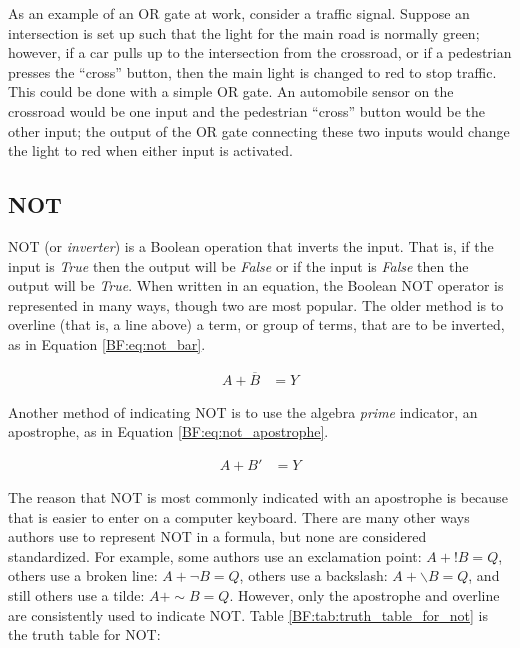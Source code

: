 As an example of an \textsf{OR} gate at work, consider a traffic signal. Suppose an intersection is set up such that the light for the main road is normally green; however, if a car pulls up to the intersection from the crossroad, or if a pedestrian presses the ``cross'' button, then the main light is changed to red to stop traffic. This could be done with a simple \textsf{OR} gate. An automobile sensor on the crossroad would be one input and the pedestrian ``cross'' button would be the other input; the output of the \textsf{OR}  gate connecting these two inputs would change the light to red when either input is activated.

\subsection{NOT}
\label{BF:subsec:not}

\textsf{NOT} (or \emph{inverter}) is a Boolean operation that inverts the input. That is, if the input is \emph{True} then the output will be \emph{False} or if the input is \emph{False} then the output will be \emph{True}. When written in an equation, the Boolean \textsf{NOT}  operator is represented in many ways, though two are most popular. The older method is to overline (that is, a line above) a term, or group of terms, that are to be inverted, as in Equation \ref{BF:eq:not_bar}.

\begin{align}
  \label{BF:eq:not_bar}
  A + \overline{B} &= Y 
\end{align}

Another method of indicating \textsf{NOT}  is to use the algebra \emph{prime} indicator, an apostrophe, as in Equation \ref{BF:eq:not_apostrophe}.

\begin{align}
  \label{BF:eq:not_apostrophe}
  A + B' &= Y 
\end{align}

The reason that \textsf{NOT} is most commonly indicated with an apostrophe is because that is easier to enter on a computer keyboard. There are many other ways authors use to represent \textsf{NOT}  in a formula, but none are considered standardized. For example, some authors use an exclamation point: $ A+!B=Q $, others use a broken line: $ A+ \neg B=Q $, others use a backslash: $ A+ \backslash B=Q $, and still others use a tilde: $ A+ \sim B =Q $. However, only the apostrophe and overline are consistently used to indicate \textsf{NOT}. Table \ref{BF:tab:truth_table_for_not} is the truth table for \textsf{NOT}:

